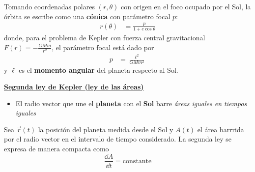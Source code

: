 \documentclass{article}
\begin{document}
Tomando coordenadas polares \((r,\theta)\) con origen en el foco ocupado por el Sol,
la órbita se escribe como una \textcolor{trueblue}{\textbf{cónica}} con parámetro focal \(p\):
\begin{equation}
\begin{split}
r(\theta)
&= \frac{p}{1 + e\cos\theta}
\end{split}\label{eq:orbita_eliptica}
\end{equation}
donde, para el problema de Kepler con fuerza central gravitacional
\(\displaystyle F(r) = -\frac{GMm}{r^{2}}\), el parámetro focal está dado por
\begin{equation}
\begin{split}
p &= \frac{\ell^{2}}{GMm^{2}}
\end{split}\label{eq:parametro_focal}
\end{equation}
y \(\ell\) es el \textcolor{vividviolet}{\textbf{momento angular}} del planeta respecto al Sol.

\vspace{0.4cm}

\noindent
\textcolor{vividviolet}{\textbf{\underline{Segunda ley de Kepler (ley de las áreas)}}}

\begin{itemize}
  \item[$\bullet$]
  El radio vector que une el \textcolor{Tarawera}{\textbf{planeta}} con el
  \textcolor{orange(colorwheel)}{\textbf{Sol}} barre \emph{áreas iguales en tiempos iguales}
\end{itemize}

Sea \(\vec r(t)\) la posición del planeta medida desde el Sol y \(A(t)\) el área
barrrida por el radio vector en el intervalo de tiempo considerado. La segunda ley
se expresa de manera compacta como
\begin{equation}
\boxed{
\frac{\dd A}{\dd t} = \text{constante}
}
\label{eq:segunda_ley_kepler}
\end{equation}
\end{document}
